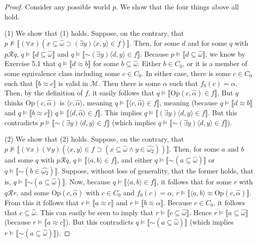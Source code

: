 \documentclass{article}
\newcommand*{\oldneg}{\mathord{\sim}}
\newcommand{\lbc}{\llbracket}
\newcommand{\rbc}{\rrbracket}
\theoremstyle{definition}
\begin{document}
\begin{proof}
Consider any possible world $p$. We show that the four things above all hold. 

(1) We show that (1) holds. Suppose, on the contrary, that 
$p\nvDash\lbc(\forall x)(x\subseteq\hat{\omega}\supset(\exists y)\langle x,y\rangle\in f)\rbc$. Then, for some 
$d$ and for some $q$ with $p\mathcal{R}q$,
$q\vDash\lbc d\subseteq\hat{\omega}\rbc$ and $q\vDash\lbc\oldneg(\exists y)\langle d,y\rangle\in f\rbc$.
Because $p\vDash\lbc d\subseteq\hat{\omega}\rbc$, we know by Exercise 5.1 that 
$q\vDash\lbc d\approx b\rbc$ for some $b\subseteq\hat{\omega}$. Either $b\in C_0$, or it is a member of 
some equivalence class including some $c\in C_0$. In either case, there is some $c\in C_0$ 
such that $\lbc b\approx c\rbc$ is valid in $\mathcal{M}$. Then there is some $\alpha$ such that 
$f_0(c)=\alpha$. Then, by the definition of $f$, it easily follows that 
$q\vDash\lbc\textrm{Op}(c,\hat{\alpha})\in f\rbc$. But 
$q$ thinks $\textrm{Op}(c,\hat{\alpha})$ is $\langle c,\hat{\alpha}\rangle$, meaning 
$q\vDash\lbc\langle c,\hat{\alpha}\rangle\in f\rbc$, meaning (because $q\vDash\lbc d\approx b\rbc$ and 
$q\vDash\lbc b\approx c\rbc$)
$q\vDash\lbc\langle d,\hat{\alpha}\rangle\in f\rbc$. This implies 
$q\vDash\lbc(\exists y)\langle d,y\rangle\in f\rbc$. But this contradicts 
$p\vDash\lbc\oldneg(\exists y)\langle d,y\rangle\in f\rbc$ (which implies
$q\vDash\lbc\oldneg(\exists y)\langle d,y\rangle\in f\rbc$).

(2) We show that (2) holds. Suppose, on the contrary, that
$p\nvDash\lbc(\forall x)(\forall y)(\langle x,y\rangle\in f\supset (x\subseteq\hat{\omega}\wedge y\in\widehat{\omega_2}))\rbc$.
Then, for some $a$ and $b$ and some $q$ with $p\mathcal{R}q$,
$q\vDash\lbc\langle a,b\rangle\in f\rbc$, and either $q\vDash\lbc\oldneg (a\subseteq\hat{\omega})\rbc$ or 
$q\vDash\lbc\oldneg (b\in\widehat{\omega_2})\rbc$. Suppose, without loss of generality, that the former holds, that 
is, $q\vDash\lbc\oldneg (a\subseteq\hat{\omega})\rbc$. Now, because 
$q\vDash\lbc\langle a,b\rangle\in f\rbc$, it follows that for some
$r$ with $q\mathcal{R}r$, and some $\textrm{Op}(c,\hat{\alpha})$ with $c\in C_0$ and 
$f_0(c)=\alpha$, $r\vDash\lbc\langle a,b\rangle\approx\textrm{Op}(c,\hat{\alpha})\rbc$. 
From this it follows that $r\vDash\lbc a\approx c\rbc$ and 
$r\vDash\lbc b\approx\hat{\alpha}\rbc$. Because $c\in C_0$, it follows that 
$c\subseteq\hat{\omega}$. This can easily be seen to imply that 
$r\vDash\lbc c\subseteq\hat{\omega}\rbc$. Hence
$r\vDash\lbc a\subseteq\hat{\omega}\rbc$ (because $r\vDash\lbc a\approx c\rbc$). But 
this contradicts $q\vDash\lbc\oldneg (a\subseteq\hat{\omega})\rbc$ (which implies 
$r\vDash\lbc\oldneg (a\subseteq\hat{\omega})\rbc$). 


\end{proof}
\end{document}
